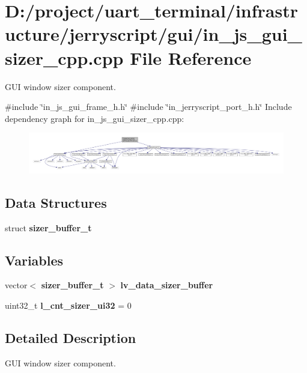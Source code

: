\section{D\+:/project/uart\+\_\+terminal/infrastructure/jerryscript/gui/in\+\_\+js\+\_\+gui\+\_\+sizer\+\_\+cpp.cpp File Reference}
\label{in__js__gui__sizer__cpp_8cpp}


G\+UI window sizer component.  


{\ttfamily \#include \char`\"{}in\+\_\+js\+\_\+gui\+\_\+frame\+\_\+h.\+h\char`\"{}}\newline
{\ttfamily \#include \char`\"{}in\+\_\+jerryscript\+\_\+port\+\_\+h.\+h\char`\"{}}\newline
Include dependency graph for in\+\_\+js\+\_\+gui\+\_\+sizer\+\_\+cpp.\+cpp\+:\nopagebreak
\begin{figure}[H]
\begin{center}
\leavevmode
\includegraphics[width=350pt]{in__js__gui__sizer__cpp_8cpp__incl}
\end{center}
\end{figure}
\subsection*{Data Structures}
\begin{DoxyCompactItemize}
\item 
struct \textbf{ sizer\+\_\+buffer\+\_\+t}
\end{DoxyCompactItemize}
\subsection*{Variables}
\begin{DoxyCompactItemize}
\item 
vector$<$ \textbf{ sizer\+\_\+buffer\+\_\+t} $>$ \textbf{ lv\+\_\+data\+\_\+sizer\+\_\+buffer}
\item 
uint32\+\_\+t {\bfseries l\+\_\+cnt\+\_\+sizer\+\_\+ui32} = 0
\end{DoxyCompactItemize}


\subsection{Detailed Description}
G\+UI window sizer component. 

